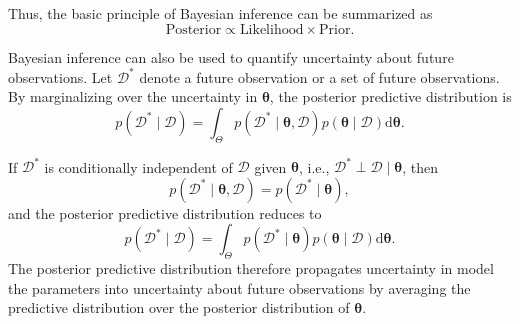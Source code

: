 \documentclass[../../Bayesian_Inference.tex]{subfiles}
\begin{document}
Thus, the basic principle of Bayesian inference can be summarized as
\[
    \boxed{
    \text{Posterior}
    \propto
    \text{Likelihood}
    \times
    \text{Prior}}.
\]

Bayesian inference can also be used to quantify uncertainty about future observations. Let $\mathcal{D}^{*}$ denote a future observation or a set of future observations. By marginalizing over the uncertainty in $\bm{\theta}$, the posterior predictive distribution is
\[
    p(\mathcal{D}^{*}\mid\mathcal{D})
    =
    \int_{\Theta}
    p(\mathcal{D}^{*}\mid\bm{\theta},\mathcal{D})
    p(\bm{\theta}\mid\mathcal{D})
    \mathrm{d}\bm{\theta}.
\]

If $\mathcal{D}^{*}$ is conditionally independent of $\mathcal{D}$ given $\bm{\theta}$, i.e., $\mathcal{D}^{*} \perp \mathcal{D} \mid \bm{\theta}$, then
\[
    p(\mathcal{D}^{*}\mid\bm{\theta},\mathcal{D})
    =
    p(\mathcal{D}^{*}\mid\bm{\theta}),
\]
and the posterior predictive distribution reduces to
\begin{equation}
    \boxed{
    p(\mathcal{D}^{*}\mid\mathcal{D})
    =
    \int_{\Theta}
    p(\mathcal{D}^{*}\mid\bm{\theta})
    p(\bm{\theta}\mid\mathcal{D})
    \mathrm{d}\bm{\theta}}
    .
\end{equation} 
The posterior predictive distribution therefore propagates uncertainty in model the parameters into uncertainty about future observations by averaging the predictive distribution over the posterior distribution of $\bm{\theta}$. 
\end{document}

